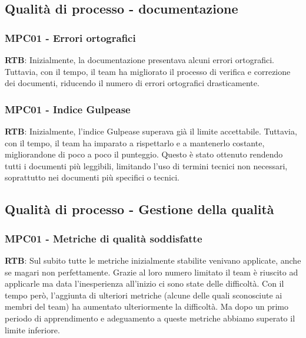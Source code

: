 \documentclass[10pt]{article}
\begin{document}
\begin{justify}
\subsection{Qualità di processo - documentazione}
\subsubsection{MPC01 - Errori ortografici}
\textbf{RTB}: Inizialmente, la documentazione presentava alcuni errori ortografici. Tuttavia, con il tempo, il team ha migliorato il processo di verifica e correzione dei documenti, riducendo il numero di errori ortografici drasticamente.
\subsubsection{MPC01 - Indice Gulpease}
\textbf{RTB}: Inizialmente, l'indice Gulpease superava già il limite accettabile. Tuttavia, con il tempo, il team ha imparato a rispettarlo e a mantenerlo costante, migliorandone di poco a poco il punteggio. Questo è stato ottenuto rendendo tutti i documenti più leggibili, limitando l'uso di termini tecnici non necessari, soprattutto nei documenti più specifici o tecnici.
\subsection{Qualità di processo - Gestione della qualità}
\subsubsection{MPC01 - Metriche di qualità soddisfatte}
\textbf{RTB}: Sul subito tutte le metriche inizialmente stabilite venivano applicate, anche se magari non perfettamente. Grazie al loro numero limitato il team è riuscito ad applicarle ma data l'inesperienza all'inizio ci sono state delle difficoltà. Con il tempo però, l'aggiunta di ulteriori metriche (alcune delle quali sconosciute ai membri del team) ha aumentato ulteriormente la difficoltà. Ma dopo un primo periodo di apprendimento e adeguamento a queste metriche abbiamo superato il limite inferiore.



\end{justify}
\end{document}
